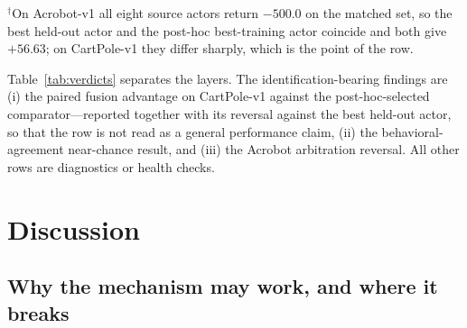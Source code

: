 \documentclass[11pt]{article}
\begin{document}
$^{\dagger}$On Acrobot-v1 all eight source actors return $-500.0$ on the matched set, so the best
held-out actor and the post-hoc best-training actor coincide and both give $+56.63$; on CartPole-v1
they differ sharply, which is the point of the row.

Table~\ref{tab:verdicts} separates the layers. The identification-bearing findings are (i) the
paired fusion advantage on CartPole-v1 against the post-hoc-selected comparator---reported together
with its reversal against the best held-out actor, so that the row is not read as a general
performance claim, (ii) the behavioral-agreement near-chance result, and
(iii) the Acrobot arbitration reversal. All other rows are diagnostics or health checks.

\section{Discussion}
\label{sec:discussion}

\subsection{Why the mechanism may work, and where it breaks}
\label{sec:discussion:mechanism}
\end{document}

